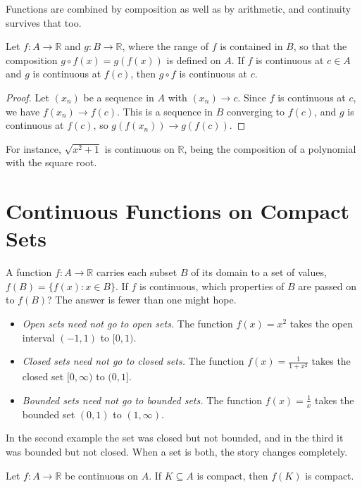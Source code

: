 Functions are combined by composition as well as by arithmetic, and continuity survives that too.

\begin{theorem}\label{thm:composition}
Let $f : A \to \mathbb{R}$ and $g : B \to \mathbb{R}$, where the range of $f$ is contained in $B$, so that the composition $g \circ f(x) = g(f(x))$ is defined on $A$.  If $f$ is continuous at $c \in A$ and $g$ is continuous at $f(c)$, then $g \circ f$ is continuous at $c$.
\end{theorem}

\begin{proof}
Let $(x_n)$ be a sequence in $A$ with $(x_n) \to c$.  Since $f$ is continuous at $c$, we have $f(x_n) \to f(c)$.  This is a sequence in $B$ converging to $f(c)$, and $g$ is continuous at $f(c)$, so $g(f(x_n)) \to g(f(c))$.
\end{proof}

For instance, $\sqrt{x^2 + 1}$ is continuous on $\mathbb{R}$, being the composition of a polynomial with the square root.

\section{Continuous Functions on Compact Sets}

A function $f : A \to \mathbb{R}$ carries each subset $B$ of its domain to a set of values, $f(B) = \{f(x) : x \in B\}$.  If $f$ is continuous, which properties of $B$ are passed on to $f(B)$?  The answer is fewer than one might hope.
\begin{itemize}
	\item \emph{Open sets need not go to open sets.}  The function $f(x) = x^2$ takes the open interval $(-1,1)$ to $[0,1)$.
	\item \emph{Closed sets need not go to closed sets.}  The function $f(x) = \frac{1}{1+x^2}$ takes the closed set $[0, \infty)$ to $(0,1]$.
	\item \emph{Bounded sets need not go to bounded sets.}  The function $f(x) = \frac1x$ takes the bounded set $(0,1)$ to $(1, \infty)$.
\end{itemize}
In the second example the set was closed but not bounded, and in the third it was bounded but not closed.  When a set is both, the story changes completely.

\begin{theorem}\label{thm:preserve-compact}
Let $f : A \to \mathbb{R}$ be continuous on $A$.  If $K \subseteq A$ is compact, then $f(K)$ is compact.
\end{theorem}

